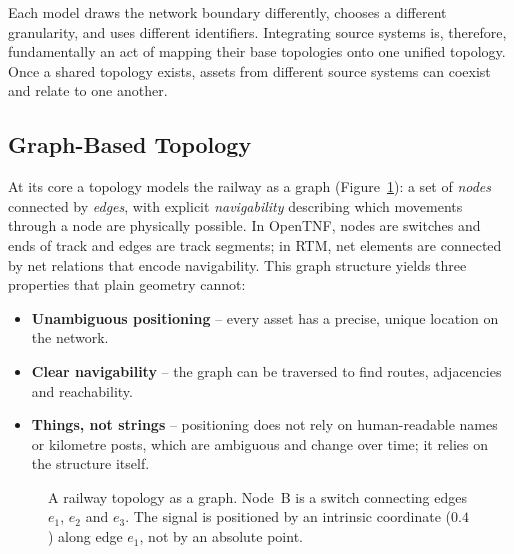 \documentclass[twocolumn]{ceurart}
\begin{document}
Each model draws the network boundary differently, chooses a different
granularity, and uses different identifiers. Integrating source systems is,
therefore, fundamentally an act of mapping their base topologies onto one
unified topology. Once a shared topology exists, assets from different source
systems can coexist and relate to one another.

\subsection{Graph-Based Topology}

At its core a topology models the railway as a graph
(Figure~\ref{fig:topology}): a set of \emph{nodes} connected by \emph{edges},
with explicit \emph{navigability} describing which movements through a node are
physically possible. In OpenTNF, nodes are switches and ends of track and edges
are track segments; in RTM, net elements are connected by net relations that
encode navigability. This graph structure yields three properties that plain
geometry cannot:

\begin{itemize}
  \item \textbf{Unambiguous positioning} -- every asset has a precise, unique
        location on the network.
  \item \textbf{Clear navigability} -- the graph can be traversed to find
        routes, adjacencies and reachability.
  \item \textbf{Things, not strings} -- positioning does not rely on
        human-readable names or kilometre posts, which are ambiguous and change
        over time; it relies on the structure itself.
\end{itemize}

\begin{figure}[t]
  \centering
  \caption{A railway topology as a graph. Node~B is a switch connecting edges
    $e_1$, $e_2$ and $e_3$. The signal is positioned by an intrinsic
    coordinate ($0.4$) along edge $e_1$, not by an absolute point.}
  \label{fig:topology}
\end{figure}
\end{document}
